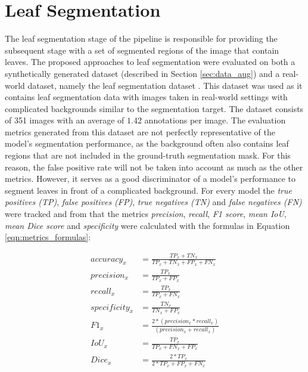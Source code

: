 \documentclass[draft,final]{vutinfth} %
\begin{document}
\section{Leaf Segmentation} \label{sec:results_segmentation}
The leaf segmentation stage of the pipeline is responsible for providing the subsequent stage with a set of segmented regions of the image that contain leaves. The proposed approaches to leaf segmentation were evaluated on both a synthetically generated dataset (described in Section \ref{sec:data_aug}) and a real-world dataset, namely the leaf segmentation dataset \cite{giovi_leaf_2024}.
This dataset was used as it contains leaf segmentation data with images taken in real-world settings with complicated backgrounds similar to the segmentation target. The dataset consists of 351 images with an average of $1.42$ annotations per image. The evaluation metrics generated from this dataset are not perfectly representative of the model's segmentation performance, as the background often also contains leaf regions that are not included in the ground-truth segmentation mask. For this reason, the false positive rate will not be taken into account as much as the other metrics. However, it serves as a good discriminator of a model's performance to segment leaves in front of a complicated background. For every model the \textit{true positives (TP)}, \textit{false positives (FP)}, \textit{true negatives (TN)} and \textit{false negatives (FN)} were tracked and from that the metrics \textit{precision}, \textit{recall}, \textit{F1 score}, \textit{mean IoU}, \textit{mean Dice score} and \textit{specificity} were calculated with the formulas in Equation \eqref{eqn:metrics_formulas}:

\begin{equation} \label{eqn:metrics_formulas}
\begin{aligned}
    accuracy_{x} & = \frac{TP_{x} + TN_{x}}{TP_{x} + TN_{x} + FP_{x} + FN_{x}}
    \\
    precision_{x} & = \frac{TP_{x}}{TP_{x} + FP_{x}}
    \\
    recall_{x} & = \frac{TP_{x}}{TP_{x} + FN_{x}}
    \\
    specificity_{x} & = \frac{TN_{x}}{TN_{x} + FP_{x}}
    \\
    F1_{x} & = \frac{2 * (precision_{x} * recall_{x})}{(precision_{x} + recall_{x})}
    \\
    IoU_{x} & = \frac{TP_{x}}{TP_{x} + FN_{x} + FP_{x}}
    \\
    Dice_{x} & = \frac{2 * TP_{x}}{2 * TP_{x} + FP_{x} + FN_{x}}
\end{aligned}
\end{equation}
\end{document}
